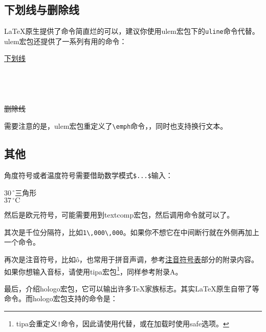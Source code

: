 {\subsection{下划线与删除线}
\LaTeX 原生提供了\latexline{\\underline}命令简直烂的可以，建议你使用ulem宏包下的\texttt{uline}命令代替。ulem宏包还提供了一系列有用的命令：

\begin{codeshow}
\uline{下划线} \\
 \\
 \\
 \\
 \\
\sout{删除线} \\
\end{codeshow}

需要注意的是，ulem宏包重定义了\verb|\emph|命令，，同时也支持换行文本。

\subsection{其他}
角度符号或者温度符号需要借助数学模式\verb|$...$|输入：

\begin{codeshow}
$30\,^{\circ}$三角形 \\
$37\,^{\circ}\mathrm{C}$
\end{codeshow}

然后是欧元符号，可能需要用到textcomp宏包，然后调用\latexline{\\texteuro}命令就可以了。

其次是千位分隔符，比如\verb|1\,000\,000|。如果你不想它在中间断行就在外侧再加上一个\latexline{\\mbox}命令。

再次是注音符号，比如\^o，也常用于拼音声调，参考\hyperref[app:phonetic]{注音符号表}部分的附录内容。如果你想输入音标，请使用tipa宏包\footnote{tipa会重定义\texttt{!}命令，因此请使用\texttt{\negthinspace}代替，或在加载时使用safe选项。}，同样参考附录A。

最后，介绍hologo宏包，它可以输出许多\TeX 家族标志。其实\LaTeX 原生自带了\latexline{\\LaTeX \TeX}等命令。而hologo宏包支持的命令是：

\begin{codeshow}
 
\end{codeshow}

}
